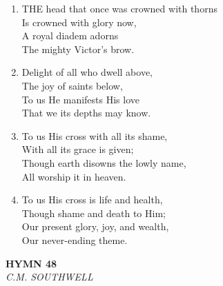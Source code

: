 \begin{enumerate}
    \item THE head that once was crowned with thorns \\
        Is crowned with glory now, \\
        A royal diadem adorns \\
        The mighty Victor's brow.

    \item Delight of all who dwell above, \\
        The joy of saints below, \\
        To us He manifests His love \\
        That we its depths may know.

    \item To us His cross with all its shame, \\
        With all its grace is given; \\
        Though earth disowns the lowly name, \\
        All worship it in heaven.

    \item To us His cross is life and health, \\
        Though shame and death to Him; \\
        Our present glory, joy, and wealth, \\
        Our never-ending theme.

\end{enumerate}

\newpage
\begin{center}
    {\Large \textbf{HYMN 48}}
    \\
    \textit{C.M. SOUTHWELL}
\end{center}
\vspace{1em}

